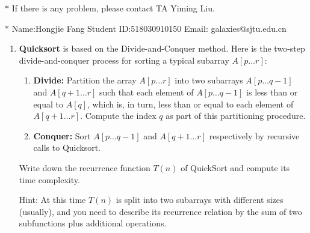 \documentclass[12pt,a4paper]{article}
\theoremstyle{definition}
\begin{document}
\noindent

\noindent{}
\begin{center}
\footnotesize{\color{red}$*$ If there is any problem, please contact TA Yiming Liu.}

\footnotesize{\color{blue}$*$ Name:Hongjie Fang  \quad Student ID:518030910150 \quad Email: galaxies@sjtu.edu.cn}
\end{center}

\begin{enumerate}
    \item
    \textbf{Quicksort} is based on the Divide-and-Conquer method. Here is the two-step divide-and-conquer process for sorting a typical subarray $A[p \ldots r]$:
    \begin{enumerate}

    	\item
    	\textbf{Divide:} Partition the array $A[p \ldots r]$ into two subarrays $A[p \ldots q-1]$ and $A[q+1 \ldots r]$ such that each element of $A[p \ldots q-1]$ is less than or equal to $A[q]$, which is, in turn, less than or equal to each element of $A[q+1 \ldots r]$. Compute the index $q$ as part of this partitioning procedure.
    	
    	\item
    	\textbf{Conquer:} Sort $A[p \ldots q-1]$ and $A[q+1 \ldots r]$ respectively by recursive calls to Quicksort.
    	
    \end{enumerate}
    Write down the recurrence function $T(n)$ of QuickSort and compute its time complexity.

    {\color{purple}Hint: At this time $T(n)$ is split into two subarrays with different sizes (usually), and you need to describe its recurrence relation by the sum of two subfunctions plus additional operations.}


\end{enumerate}
\end{document}
